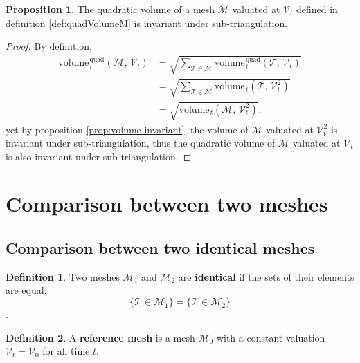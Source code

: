\documentclass{article}
\theoremstyle{definition}
\newtheorem{defn}{Definition}
\newtheorem{prop}{Proposition}
\newcommand{\MM}{\mathcal{M}}
\newcommand{\VV}{\mathcal{V}}
\newcommand{\TT}{\mathcal{T}}
\newcommand{\vol}{\mathrm{volume\hspace{1pt}}}
\newcommand{\quadvol}{\mathrm{volume\hspace{1pt}}^\mathrm{quad}}
\begin{document}
\begin{prop}
The quadratic volume of a mesh $\MM$ valuated at $\VV_t$ defined in definition \ref{def:quadVolumeM} is invariant under sub-triangulation.\label{prop:quadvolume-invariant}
\end{prop}
\begin{proof}[Proof]By definition,
\begin{align*}
\quadvol_t(\MM,\,\VV_t) & = \sqrt{\sum_{\TT\in\MM}\quadvol_t(\TT,\,\VV_t)}\\
& = \sqrt{\sum_{\TT\in\MM}\vol_t(\TT,\,\VV_t^2)}\\
& = \sqrt{\vol_t(\MM,\,\VV_t^2)},
\end{align*}
yet by proposition \ref{prop:volume-invariant}, the volume of $\MM$ valuated at $\VV_t^2$ is invariant under sub-triangulation, thus the quadratic volume of $\MM$ valuated at $\VV_t$ is also invariant under sub-triangulation.
\end{proof}



\section{Comparison between two meshes}


\subsection{Comparison between two identical meshes}
\begin{defn}
Two meshes $\MM_1$ and $\MM_2$ are \textbf{identical} if the sets of their elements are equal:
\[\{\TT\in\MM_1\} = \{\TT\in\MM_2\}\].
\end{defn}

\begin{defn}
A \textbf{reference mesh} is a mesh $\MM_0$ with a constant valuation $\VV_t = \VV_0$ for all time $t$.
\end{defn}
\end{document}
